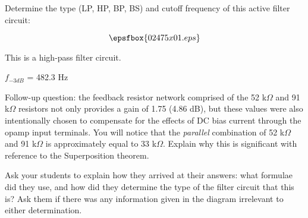 

Determine the type (LP, HP, BP, BS) and cutoff frequency of this active filter circuit:

$$\epsfbox{02475x01.eps}$$







This is a high-pass filter circuit.

$f_{-3dB}$ = 482.3 Hz

\vskip 10pt

Follow-up question: the feedback resistor network comprised of the 52 k$\Omega$ and 91 k$\Omega$ resistors not only provides a gain of 1.75 (4.86 dB), but these values were also intentionally chosen to compensate for the effects of DC bias current through the opamp input terminals.  You will notice that the {\it parallel} combination of 52 k$\Omega$ and 91 k$\Omega$ is approximately equal to 33 k$\Omega$.  Explain why this is significant with reference to the Superposition theorem.







Ask your students to explain how they arrived at their answers: what formulae did they use, and how did they determine the type of the filter circuit that this is?  Ask them if there was any information given in the diagram irrelevant to either determination.




